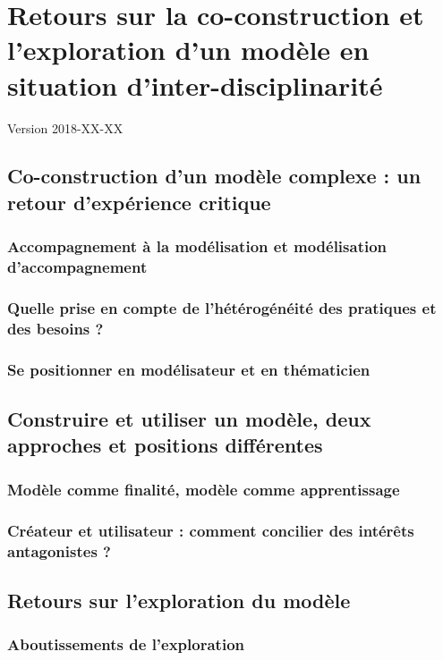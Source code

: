 \chapter{Retours sur la co-construction et l'exploration d'un modèle en situation d'inter-disciplinarité}
\begin{center}
	{\large Version 2018-XX-XX}
\end{center}
\minitoc

\section{Co-construction d'un modèle complexe : un retour d'expérience critique}
\subsection{Accompagnement à la modélisation et modélisation d'accompagnement}
\subsection{Quelle prise en compte de l'hétérogénéité des pratiques et des besoins ?}
\subsection{Se positionner en modélisateur et en thématicien}

\section{Construire et utiliser un modèle, deux approches et positions différentes}
\subsection{Modèle comme finalité, modèle comme apprentissage}
\subsection{Créateur et utilisateur : comment concilier des intérêts antagonistes ?}

\section{Retours sur l'exploration du modèle}
\subsection{Aboutissements de l'exploration}
